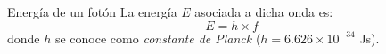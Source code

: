 \begin{infocard}{Energía de un fotón}%
    La energía $E$ asociada a dicha onda es:
    \begin{equation}
        E=h \times f
    \end{equation}
    donde $h$ se conoce como \emph{constante de Planck} ($h=6.626 \times 10^{-34}$ Js).
\end{infocard}%